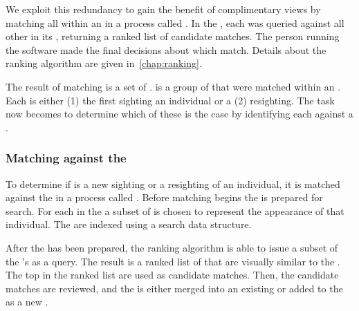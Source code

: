             We exploit this redundancy to gain the benefit of complimentary views by matching all \annots{} within an
            \occurrence{} in a process called . In the \GZC{}, each \annot{} was
            queried against all other \annots{} in its \occurrence{}, returning a ranked list of candidate matches. The
            person running the software made the final decisions about which \annots{} match. Details about the ranking
            algorithm are given in~\cref{chap:ranking}.

            The result of \intraoccurrence{} matching is a set of \glossterm{\encounters{}}. \Aan{\encounter{}} is a
            group of \annots{} that were matched within an \occurrence{}. Each \encounter{} is either (1) the first
            sighting an individual or a (2) resighting. The task now becomes to determine which of these is the case by
            identifying each \encounter{} against a \masterdatabase{}.

            \OccurrenceComplementFigure{}
 
        \subsubsection{Matching against the \masterdatabase{}} %
            To determine if \aan{\encounter{}} is a new sighting or a resighting of an individual, it is matched
            against the \masterdatabase{} in a process called . Before matching
            begins the \masterdatabase{} is prepared for search. For each \name{} in the \masterdatabase{} a subset
            of \glossterm{\exemplar{}} \annots{} is chosen to represent the appearance of that individual. The
            \exemplars{} are indexed using a search data structure.

            After the \masterdatabase{} has been prepared, the ranking algorithm is able to issue a subset of the
              \encounter{}'s \annots{} as a query.
            The result is a ranked list of \exemplars{} that are visually similar to the \encounter{}.
            The top \exemplars{} in the ranked list are used as candidate matches.
            Then, the candidate matches are reviewed, and the \encounter{} is either merged into an existing
              \mastername{} or added to the \masterdatabase{} as a new \mastername{}.

